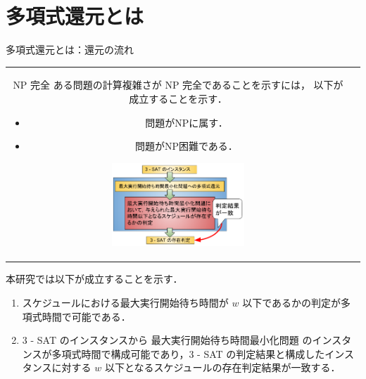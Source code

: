 \documentclass[dvipdfmx]{beamer}
\begin{document}
\section{多項式還元とは}
\begin{frame}{多項式還元とは：還元の流れ}
  \begin{tabular}{cc}
    \begin{minipage}[c]{0.5\hsize}
      \begin{block}{NP 完全}
        ある問題の計算複雑さが NP 完全であることを示すには，
        以下が成立することを示す．
        \begin{itemize}
          \item 問題がNPに属す．
          \item 問題がNP困難である．
        \end{itemize}
      \end{block}
    \end{minipage}
    \begin{minipage}[c]{0.5\hsize}
      \begin{figure}[c]
        \centering
        \includegraphics[width=5cm,bb=0 0 360 260
        ]{figure/reduction.pdf}
      \end{figure}
    \end{minipage}
  \end{tabular}
  \begin{block}{}
    本研究では以下が成立することを示す．
    \begin{enumerate}
      \item スケジュールにおける最大実行開始待ち時間が $w$ 以下であるかの判定が\alert{多項式時間}で可能である．
      \item 3 - SAT のインスタンスから 最大実行開始待ち時間最小化問題 のインスタンスが\alert{多項式時間}で構成可能であり，3 - SAT の判定結果と構成したインスタンスに対する $w$ 以下となるスケジュールの存在判定結果が\alert{一致}する．
    \end{enumerate}
  \end{block}
\end{frame}
\end{document}
